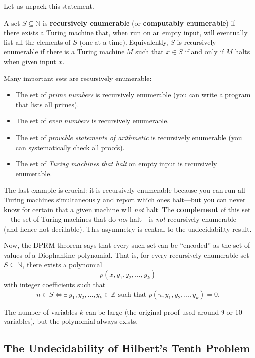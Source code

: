 Let us unpack this statement.

\begin{definition}
A set $S \subseteq \mathbb{N}$ is \textbf{recursively enumerable} (or \textbf{computably enumerable}) if there exists a Turing machine that, when run on an empty input, will eventually list all the elements of $S$ (one at a time). Equivalently, $S$ is recursively enumerable if there is a Turing machine $M$ such that $x \in S$ if and only if $M$ halts when given input $x$.
\end{definition}

Many important sets are recursively enumerable:
\begin{itemize}
    \item The set of \emph{prime numbers} is recursively enumerable (you can write a program that lists all primes).
    \item The set of \emph{even numbers} is recursively enumerable.
    \item The set of \emph{provable statements of arithmetic} is recursively enumerable (you can systematically check all proofs).
    \item The set of \emph{Turing machines that halt} on empty input is recursively enumerable.
\end{itemize}

The last example is crucial: it is recursively enumerable because you can run all Turing machines simultaneously and report which ones halt---but you can never know for certain that a given machine will \emph{not} halt. The \textbf{complement} of this set---the set of Turing machines that do \emph{not} halt---is \emph{not} recursively enumerable (and hence not decidable). This asymmetry is central to the undecidability result.

Now, the DPRM theorem says that every such set can be ``encoded'' as the set of values of a Diophantine polynomial. That is, for every recursively enumerable set $S \subseteq \mathbb{N}$, there exists a polynomial
\[
    p(x, y_1, y_2, \ldots, y_k)
\]
with integer coefficients such that
\[
    n \in S \iff \exists\, y_1, y_2, \ldots, y_k \in \mathbb{Z} \text{ such that } p(n, y_1, y_2, \ldots, y_k) = 0.
\]

The number of variables $k$ can be large (the original proof used around 9 or 10 variables), but the polynomial always exists.

\subsection{The Undecidability of Hilbert's Tenth Problem}

